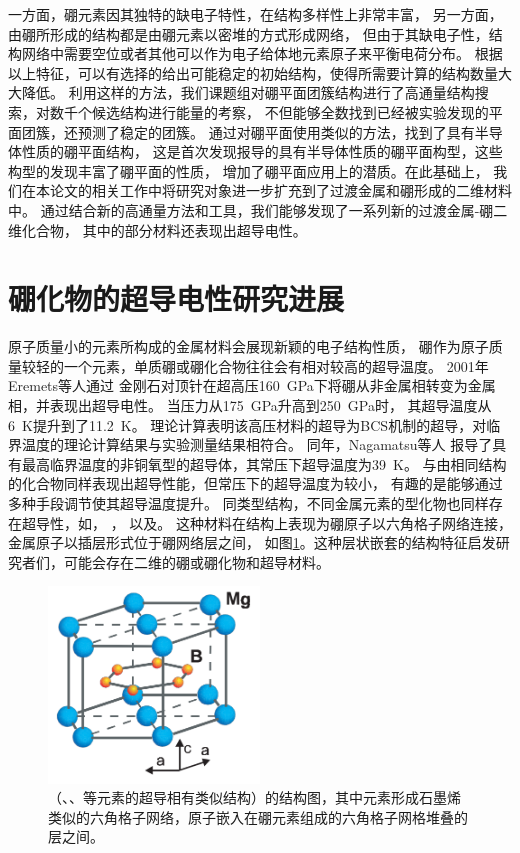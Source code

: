 一方面，硼元素因其独特的缺电子特性，在结构多样性上非常丰富，
另一方面，由硼所形成的结构都是由硼元素以密堆的方式形成网络，
但由于其缺电子性，结构网络中需要空位或者其他可以作为电子给体地元素原子来平衡电荷分布。
根据以上特征，可以有选择的给出可能稳定的初始结构，使得所需要计算的结构数量大大降低。
利用这样的方法，我们课题组对硼平面团簇结构进行了高通量结构搜索，对数千个候选结构进行能量的考察，
不但能够全数找到已经被实验发现的平面团簇，还预测了稳定的团簇\cite{xu2017practical}。
通过对硼平面使用类似的方法，找到了具有半导体性质的硼平面结构\cite{xu2017two}，
这是首次发现报导的具有半导体性质的硼平面构型，这些构型的发现丰富了硼平面的性质，
增加了硼平面应用上的潜质。在此基础上，
我们在本论文的相关工作中将研究对象进一步扩充到了过渡金属和硼形成的二维材料中。
通过结合新的高通量方法和工具，我们能够发现了一系列新的过渡金属-硼二维化合物，
其中的部分材料还表现出超导电性。

\section{硼化物的超导电性研究进展}

原子质量小的元素所构成的金属材料会展现新颖的电子结构性质，
硼作为原子质量较轻的一个元素，单质硼或硼化合物往往会有相对较高的超导温度。
2001年Eremets等人\cite{eremets2001superconductivity}通过
金刚石对顶针在超高压\SI{160}{\GPa}下将硼从非金属相转变为金属相，并表现出超导电性。
当压力从\SI{175}{\GPa}升高到\SI{250}{\GPa}时，
其超导温度从\SI{6}{\kelvin}提升到了\SI{11.2}{\kelvin}。
理论计算表明该高压材料的超导为BCS机制的超导，对临界温度的理论计算结果与实验测量结果相符合。
同年，Nagamatsu等人\cite{nagamatsu2001superconductivity}
报导了具有最高临界温度的非铜氧型的超导体\cite{buzea2001review}，其常压下超导温度为\SI{39}{\kelvin}。
与由相同结构的化合物同样表现出超导性能，但常压下的超导温度为较小，
有趣的是能够通过多种手段调节使其超导温度提升。
同类型结构，不同金属元素的型化物也同样存在超导性，如，
\cite{barbero2017doping}，\cite{mudgel2008superconductivity}
以及\cite{singh2001superconductivity}。
这种材料在结构上表现为硼原子以六角格子网络连接，金属原子以插层形式位于硼网络层之间，
如图\ref{fig:ch1_mgb2}。这种层状嵌套的结构特征启发研究者们，可能会存在二维的硼或硼化物和超导材料。

\begin{figure}[bt]
  \includegraphics[width=0.50\textwidth]{figs/ch1_mgb2.png}
  \centering
  \caption{（、、等元素的超导相有类似结构）的结构图，其中元素形成石墨烯类似的六角格子网络，原子嵌入在硼元素组成的六角格子网格堆叠的层之间。}
  \label{fig:ch1_mgb2}
\end{figure}

